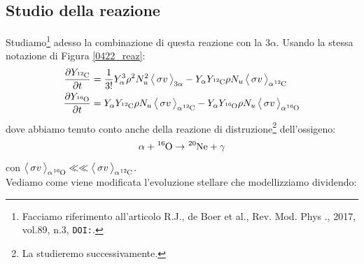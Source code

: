 \subsection{Studio della reazione} Studiamo\footnote{Facciamo riferimento all'articolo R.J., de Boer et al., Rev. Mod. Phys 
., 2017, vol.89, n.3, \texttt{DOI:}.} adesso la combinazione di questa reazione con la $3\alpha$. Usando la stessa notazione di Figura \ref{0422_reaz}:
\begin{align*}
	\tderpar{Y_{\ce{^{12}C}}} &= \frac{1}{3!} Y_{\alpha}^3 \rho^2 N_u^2 \, \mean{\sigma v}_{3\alpha} - Y_\alpha Y_{\ce{^{12}C}} \rho N_u \, \mean{\sigma v}_{\alpha\ce{^{12}C}} \\
	\tderpar{Y_{\ce{^{16}O}}} &= Y_\alpha Y_{\ce{^{12}C}} \rho N_u \, \mean{\sigma v}_{\alpha\ce{^{12}C}} - Y_\alpha Y_{\ce{^{16}O}} \rho N_u \, \mean{\sigma v}_{\alpha\ce{^{16}O}}	
\end{align*}
dove abbiamo tenuto conto anche della reazione di distruzione\footnote{La studieremo successivamente.} dell'ossigeno:
$$\alpha + \ce{^{16}O} \to \ce{^{20}Ne} + \gamma$$
con $\mean{\sigma v}_{\alpha \ce{^{16}O}}\ll\ll \mean{\sigma v}_{\alpha \ce{^{12}C}}$.\\ 
Vediamo come viene modificata l'evoluzione stellare che modellizziamo dividendo:
